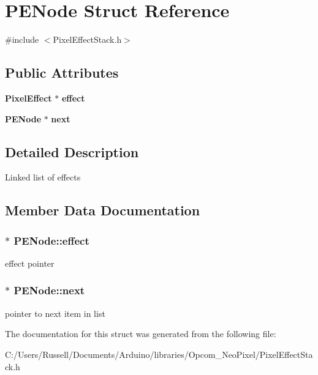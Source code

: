 \section{P\+E\+Node Struct Reference}
\label{struct_p_e_node}


{\ttfamily \#include $<$Pixel\+Effect\+Stack.\+h$>$}

\subsection*{Public Attributes}
\begin{DoxyCompactItemize}
\item 
{\bf Pixel\+Effect} $\ast$ {\bf effect}
\item 
{\bf P\+E\+Node} $\ast$ {\bf next}
\end{DoxyCompactItemize}


\subsection{Detailed Description}
Linked list of effects 

\subsection{Member Data Documentation}
\subsubsection[{effect}]{$\ast$ P\+E\+Node\+::effect}\label{struct_p_e_node_a591d88d783fdb83bfb32b1590a1d1152}
effect pointer 
\subsubsection[{next}]{$\ast$ P\+E\+Node\+::next}\label{struct_p_e_node_af10ed8847b32092d7b81103edd83b270}
pointer to next item in list 

The documentation for this struct was generated from the following file\+:\begin{DoxyCompactItemize}
\item 
C\+:/\+Users/\+Russell/\+Documents/\+Arduino/libraries/\+Opcom\+\_\+\+Neo\+Pixel/Pixel\+Effect\+Stack.\+h\end{DoxyCompactItemize}
